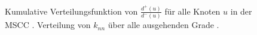 \begin{figure}[th!]
  \centering
  \caption{Kumulative Verteilungsfunktion von $\frac{d^+(u)}{d^-(u)}$
    für alle Knoten $u$ in der MSCC
    . Verteilung von $k_{nn}$ über alle
    ausgehenden Grade .}
  \label{fig:degree-correlation}
\end{figure}

